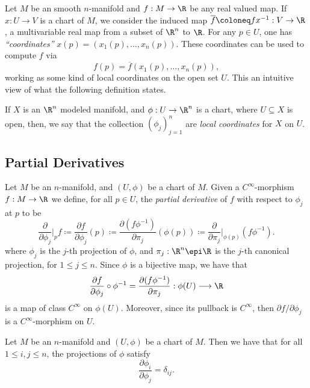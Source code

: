 Let \(M\) be an smooth \(n\)-manifold and \(f: M \to \R\) be any real valued
map. If \(x: U \to V\) is a chart of \(M\), we consider the induced map
\(\overline{f} \coloneq f x^{-1}: V \to \R\), a multivariable real map from a
subset of \(\R^n\) to \(\R\). For any \(p \in U\), one has
\emph{``coordinates''} \(x(p) = (x_1(p), \dots, x_n(p))\). These coordinates can
be used to compute \(f\) via
\[
f(p) = \overline{f}(x_1(p), \dots, x_n(p)),
\]
working as some kind of local coordinates on the open set \(U\). This an
intuitive view of what the following definition states.

\begin{definition}
\label{def:local-coordinates}
If \(X\) is an \(\R^n\) modeled manifold, and \(\phi: U \to \R^n\) is a chart,
where \(U \subseteq X\) is open, then, we say that the collection
\((\phi_j)_{j=1}^n\) are \emph{local coordinates} for \(X\) on \(U\).
\end{definition}

\subsection{Partial Derivatives}

\begin{definition}
\label{def:partial-derivative-manifold}
Let \(M\) be an \(n\)-manifold, and \((U, \phi)\) be a chart of \(M\). Given a
\(C^{\infty}\)-morphism \(f: M \to \R\) we define, for all \(p \in U\), the
\emph{partial derivative} of \(f\) with respect to \(\phi_j\) at \(p\) to be
\[
\frac{\partial}{\partial \phi_j} \bigg|_p f
\coloneq \frac{\partial f}{\partial \phi_j}(p)
\coloneq \frac{\partial (f \phi^{-1})}{\partial \pi_j}(\phi(p))
\coloneq \frac{\partial}{\partial \pi_{j}} \bigg|_{\phi(p)} (f \phi^{-1}).
\]
where \(\phi_j\) is the \(j\)-th projection of \(\phi\), and
\(\pi_j: \R^n \epi \R\) is the \(j\)-th canonical projection, for
\(1 \leq j \leq n\). Since \(\phi\) is a bijective map, we have that
\[
\frac{\partial f}{\partial \phi_j} \circ \phi^{-1}
= \frac{\partial (f \phi^{-1})}{\partial \pi_j}:
\phi(U) \longrightarrow \R
\]
is a map of class \(C^{\infty}\) on \(\phi(U)\). Moreover, since its pullback is
\(C^{\infty}\), then \(\partial f/\partial \phi_j\) is a \(C^{\infty}\)-morphism on \(U\).
\end{definition}

\begin{proposition}
\label{prop:partial-derivative-distinct-projections}
Let \(M\) be an \(n\)-manifold and \((U, \phi)\) be a chart of \(M\). Then we
have that for all \(1 \leq i, j \leq n\), the projections of \(\phi\) satisfy
\[
\frac{\partial \phi_i}{\partial \phi_j} = \delta_{i j}.
\]
\end{proposition}


